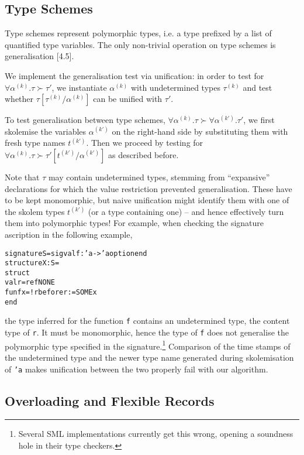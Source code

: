 \documentclass[twoside,titlepage]{article}
\begin{document}
\subsection{Type Schemes}
\label{typeschemes}

Type schemes represent polymorphic types, i.e. a type prefixed by a list of quantified type variables. The only non-trivial operation on type schemes is generalisation [4.5].

We implement the generalisation test via unification: in order to test for $\forall\alpha^{(k)}.\tau \succ \tau'$, we instantiate $\alpha^{(k)}$ with undetermined types $\tau^{(k)}$ and test whether $\tau[\tau^{(k)}/\alpha^{(k)}]$ can be unified with $\tau'$.

To test generalisation between type schemes, $\forall\alpha^{(k)}.\tau \succ \forall\alpha^{(k')}.\tau'$, we first skolemise the variables $\alpha^{(k')}$ on the right-hand side by substituting them with fresh type names $t^{(k')}$. Then we proceed by testing for $\forall\alpha^{(k)}.\tau \succ \tau'[t^{(k')}/\alpha^{(k')}]$ as described before.

Note that $\tau$ may contain undetermined types, stemming from ``expansive'' declarations for which the value restriction prevented generalisation. These have to be kept monomorphic, but naive unification might identify them with one of the skolem types $t^{(k')}$ (or a type containing one) -- and hence effectively turn them into polymorphic types! For example, when checking the signature ascription in the following example,

\begin{quoting}
\begin{alltt}
signature S = sig val f : 'a -> 'a option end
structure X : S =
struct
    val r = ref NONE
    fun f x = !r before r := SOME x
end
\end{alltt}
\end{quoting}

the type inferred for the function {\tt f} contains an undetermined type, the content type of {\tt r}. It must be monomorphic, hence the type of {\tt f} does not generalise the polymorphic type specified in the signature.\footnote{Several SML implementations currently get this wrong, opening a soundness hole in their type checkers.} Comparison of the time stamps of the undetermined type and the newer type name generated during skolemisation of {\tt 'a} makes unification between the two properly fail with our algorithm.


\subsection{Overloading and Flexible Records}
\label{overloading}
\end{document}
